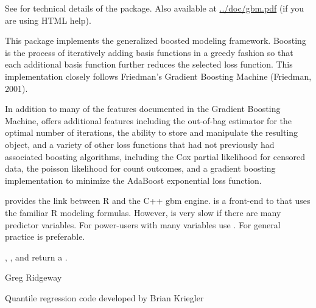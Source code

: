 \begin{Details}\relax
See  for technical details of the package. Also available 
at \url{../doc/gbm.pdf} (if you are using HTML help).

This package implements the generalized boosted modeling framework.
Boosting is the process of iteratively adding basis functions in a greedy
fashion so that each additional basis function further reduces the selected
loss function. This implementation closely follows Friedman's Gradient
Boosting Machine (Friedman, 2001).

In addition to many of the features documented in the Gradient Boosting Machine,
 offers additional features including the out-of-bag estimator for
the optimal number of iterations, the ability to store and manipulate the
resulting  object, and a variety of other loss functions that had not
previously had associated boosting algorithms, including the Cox partial
likelihood for censored data, the poisson likelihood for count outcomes, and a
gradient boosting implementation to minimize the AdaBoost exponential loss
function.

 provides the link between R and the C++ gbm engine. 
is a front-end to  that uses the familiar R modeling formulas.
However,  is very slow if there are many
predictor variables. For power-users with many variables use .
For general practice  is preferable.
\end{Details}
\begin{Value}
, , and  return a
.
\end{Value}
\begin{Author}\relax
Greg Ridgeway 

Quantile regression code developed by Brian Kriegler 
\end{Author}

